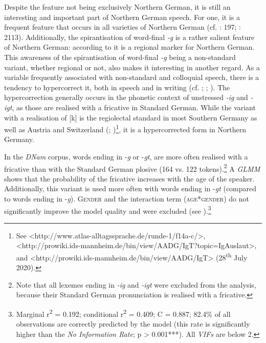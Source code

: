\documentclass[output=paper]{langsci/langscibook}
\begin{document}
Despite the feature not being exclusively Northern German, it is still an interesting and important part of Northern German speech. For one, it is a frequent feature that occurs in all varieties of Northern German (cf. \citealt{lauf_regional_1996}: 197; \citealt{mihm_sprachgeschichte_2000}: 2113). Additionally, the spirantisation of word-final \textit{-g} is a rather salient feature of Northern German: according to \citet[159]{berend_standard_2008} it is a regional marker for Northern German. This awareness of the spirantisation of word-final \textit{-g} being a non-standard variant, whether regional or not, also makes it interesting in another regard. As a variable frequently associated with non-standard and colloquial speech, there is a tendency to hypercorrect it, both in speech and in writing (cf. \citealt{rosenberg_berliner_1986}; \citealt{martens_niederdeutsch-bedingte_1988}; \citealt{eichinger_deutsche_2007}). The hypercorrection generally occurs in the phonetic context of unstressed \textit{-ig} and \textit{-igt}, as those are realised with a fricative in Standard German. While the variant with a realisation of [k] is the regiolectal standard in most Southern Germany as well as Austria and Switzerland (\citealt{elspas_atlas_2003}; \citealt{kleiner_atlas_2011})\footnote{See <http://www.atlas-alltagssprache.de/runde-1/f14a-c/>, <http://prowiki.ids-mannheim.de/bin/view/AADG/IgT?topic=IgAuslaut>, and <http://prowiki.ids-mannheim.de/bin/view/AADG/IgT> (28\textsuperscript{th} July 2020).}, it is a hypercorrected form in Northern Germany. 

In the \textit{DNam} corpus, words ending in \nobreakdash-\textit{g} or -\textit{gt}, are more often realised with a fricative than with the Standard German plosive (164 vs. 122 tokens).\footnote{Note that all lexemes ending in \textit{-ig} and \textit{-igt} were excluded from the analysis, because their Standard German pronunciation is realised with a fricative.} A \textit{GLMM} shows that the probability of the fricative increases with the age of the speaker. Additionally, this variant is used more often with words ending in -\textit{gt} (compared to words ending in -\textit{g}). \textsc{Gender} and the interaction term (\textsc{age*gender}) do not significantly improve the model quality and were excluded (see ).\footnote{Marginal r\textsuperscript{2} = 0.192; conditional r\textsuperscript{2} = 0.409; C = 0.887; 82.4\% of all observations are correctly predicted by the model (this rate is significantly higher than the \textit{No Information Rate}; p > 0.001***). All \textit{VIFs} are below 2.}
\end{document}
